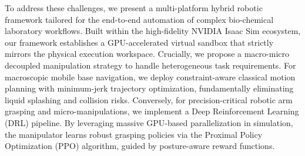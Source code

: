 \documentclass[journal,twocolumn]{IEEEtran}
\begin{document}
To address these challenges, we present a multi-platform hybrid robotic framework tailored for the end-to-end automation of complex bio-chemical laboratory workflows. Built within the high-fidelity NVIDIA Isaac Sim ecosystem, our framework establishes a GPU-accelerated virtual sandbox that strictly mirrors the physical execution workspace. Crucially, we propose a macro-micro decoupled manipulation strategy to handle heterogeneous task requirements. For macroscopic mobile base navigation, we deploy constraint-aware classical motion planning with minimum-jerk trajectory optimization, fundamentally eliminating liquid splashing and collision risks. Conversely, for precision-critical robotic arm grasping and micro-manipulations, we implement a Deep Reinforcement Learning (DRL) pipeline. By leveraging massive GPU-based parallelization in simulation, the manipulator learns robust grasping policies via the Proximal Policy Optimization (PPO) algorithm, guided by posture-aware reward functions.
\end{document}
